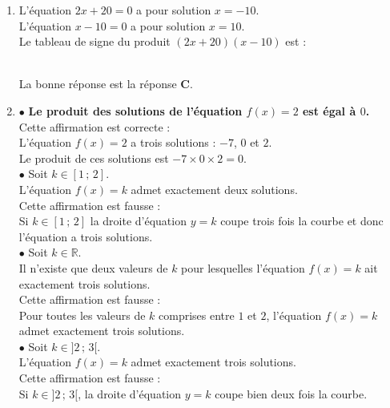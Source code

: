 \documentclass[a4paper,11pt]{article}
\begin{document}
\begin{seanceD}{}
\begin{enumerate}
\begin{minipage}[c]{0.4\textwidth}
\begin{tikzpicture}[baseline,scale=0.7]
\end{tikzpicture}\end{minipage} 
            Comme la fonction racine carrée est définie sur $[0\,;\,+\infty[$, l'ensemble des solutions de l'inéquation $(I)$ est : {\bfseries \color[HTML]{F15929}$S = [0\,;\,144]$}.\\La bonne réponse est la réponse {\bfseries \color[HTML]{F15929}D}.

\item L'équation $2x+20=0$ a pour solution $x=-10$.\\
  L'équation $x-10=0$ a pour solution $x=10$.\\
  Le tableau de signe du produit $(2x+20)(x-10)$ est : \\
\\La bonne réponse est la réponse {\bfseries \color[HTML]{F15929}C}.

\item $\bullet$ {\bfseries \color[HTML]{F15929}Le produit des solutions de l'équation $f(x)=2$ est égal à $0$.}\\  Cette affirmation est correcte : \\L'équation $f(x)=2$ a trois solutions : $-7$, $0$ et $2$.\\
          Le produit de ces solutions est $-7\times 0\times 2= 0$.\\$\bullet$ Soit $k\in[1\,;\,2]$. \\
          L'équation $f(x)=k$ admet exactement deux solutions.\\  Cette affirmation est fausse : \\Si $k\in[1\,;\,2]$ la droite d'équation $y=k$ coupe trois fois la courbe et donc l'équation a trois solutions.\\$\bullet$ Soit $k\in\mathbb{R}$. \\
          Il n'existe que deux valeurs de $k$ pour lesquelles l'équation $f(x)=k$ ait exactement trois solutions.\\  Cette affirmation est fausse : \\Pour toutes les valeurs de $k$ comprises entre $1$ et $2$, l'équation $f(x)=k$ admet exactement trois solutions.\\$\bullet$ Soit $k\in]2\,;\,3[$. \\
          L'équation $f(x)=k$ admet exactement trois solutions.\\  Cette affirmation est fausse : \\Si $k\in]2\,;\,3[$,  la droite d'équation $y=k$ coupe bien deux fois la courbe.


\end{enumerate}
\end{seanceD}
\end{document}
